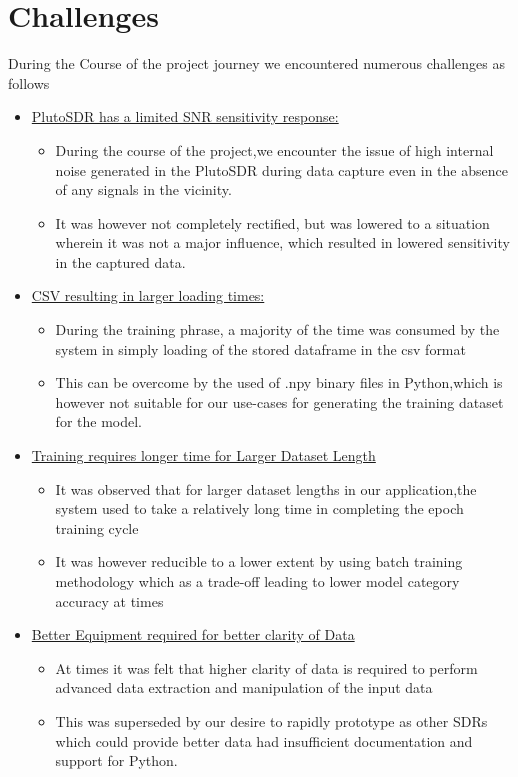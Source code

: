 \section{Challenges} \label{Challenges}
During the Course of the project journey we encountered numerous challenges as follows
\begin{itemize}
  \item \underline{ PlutoSDR has a limited SNR sensitivity response:  }
    \begin{itemize}
      \item During the course of the project,we encounter the issue of high internal noise generated in the PlutoSDR during data capture even in the absence of any signals in the vicinity.
      \item It was however not completely rectified, but was lowered to a situation wherein it was not a major influence, which resulted in lowered sensitivity in the captured data.
    \end{itemize}
  \item \underline{CSV resulting in larger loading times:}
    \begin{itemize}
      \item During the training phrase, a majority of the time was consumed by the system in simply loading of the stored dataframe in the csv format
      \item This can be overcome by the used of .npy binary files in Python,which is however not suitable for our use-cases for generating the training dataset for the model.
    \end{itemize}

  \item \underline{Training requires longer time for Larger Dataset Length
    }    \begin{itemize}
      \item It was observed that for larger dataset lengths in our application,the system used to take a relatively long time in completing the epoch training cycle
      \item It was however reducible to a lower extent by using batch training methodology which as a trade-off leading to lower model category accuracy at times

    \end{itemize}

  \item \underline{ Better Equipment required for better clarity of Data}%
    \begin{itemize}
      \item At times it was felt that higher clarity of data is required to perform advanced data extraction and manipulation of the input data
      \item This was superseded by our desire to rapidly  prototype as other SDRs which could provide better data had insufficient documentation and support for Python.

    \end{itemize}

\end{itemize}
